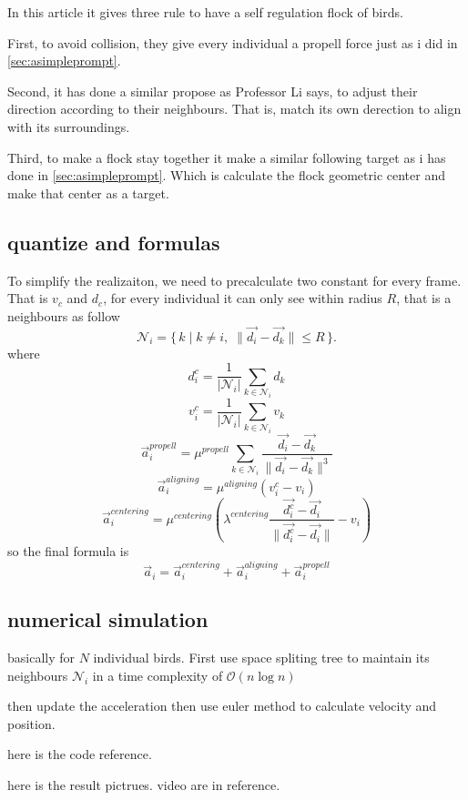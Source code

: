 \documentclass{article}
\theoremstyle{definition} %
\begin{document}
In this article it gives three rule to
have a self regulation flock of birds.

First, to avoid collision, they give every
individual a propell force just as i did in
\ref{sec:asimpleprompt}.

Second, it has done a similar propose as
Professor Li says, to adjust their direction
according to their neighbours. That is, match
its own derection to align with its surroundings.

Third, to make a flock stay together it make a similar
following target as i has done in \ref{sec:asimpleprompt}.
Which is calculate the flock geometric center and
make that center as a target.

\subsection{quantize and formulas}
To simplify the realizaiton, we need to precalculate
two constant for every frame.
That is \(v_c\) and \(d_c\), for every individual
it can only see within radius \(R\), that is a neighbours as
follow
\[
    \mathcal{N}_i = \{\, k \;\big|\; k\neq i,\;\|\vec{d_i}-\vec{d_k}\|\leq R \,\}.
\]
where
\[
    d^c_i = \frac{1}{|\mathcal{N}_i|} \sum_{k \in \mathcal{N}_i} d_k
\]
\[
    v^c_i = \frac{1}{|\mathcal{N}_i|} \sum_{k \in \mathcal{N}_i} v_k
\]
\[
    \vec{a}_i^{propell}=\mu^{propell}\sum_{k \in \mathcal{N}_i} \frac{\vec{d_i}-\vec{d_k}}{\|\vec{d_i}-\vec{d_k}\|^3}
\]
\[
    \vec{a}_i^{aligning}=\mu^{aligning}(v_i^c-v_i)
\]
\[
    \vec{a}_i^{centering}=\mu^{centering}(\lambda^{centering}\frac{\vec{d^c_i}-\vec{d_i}}{\|\vec{d^c_i}-\vec{d_i}\|}-v_i)
\]
so the final formula is
\[
    \vec{a}_i=\vec{a}_i^{centering}+\vec{a}_i^{aligning}+\vec{a}_i^{propell}
\]

\subsection{numerical simulation}
basically for \(N\) individual birds.
First use space spliting tree to maintain
its neighbours \(\mathcal{N}_i\) in a time complexity of
\(\mathcal{O}(n \log n)\)

then update the acceleration then use euler method to calculate
velocity and position.

here is the code reference.

here is the result pictrues.
video are in reference.


\end{document}
